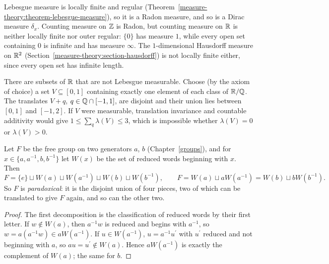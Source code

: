 \begin{example}\label{measure-theory:example-regular}
Lebesgue measure is locally finite and regular (Theorem~\ref{measure-theory:theorem-lebesgue-measure}), so it is a Radon measure, and so is a Dirac measure $\delta_x$. Counting measure on $\mathbb{Z}$ is
Radon, but counting measure on $\mathbb{R}$ is neither locally finite nor outer regular: $\{0\}$ has measure $1$, while every open set containing $0$ is infinite and has measure $\infty$. The
$1$-dimensional Hausdorff measure on $\mathbb{R}^2$ (Section~\ref{measure-theory:section-hausdorff}) is not locally finite either, since every open set has infinite length.
\end{example}

\begin{counterexample}\label{measure-theory:counterexample-vitali}
There are subsets of $\mathbb{R}$ that are not Lebesgue measurable. Choose (by the axiom of choice) a set $V \subseteq [0, 1]$ containing exactly one element of each class of $\mathbb{R}/\mathbb{Q}$. The translates $V + q$, $q \in \mathbb{Q} \cap [-1, 1]$,
are disjoint and their union lies between $[0, 1]$ and $[-1, 2]$. If $V$ were measurable, translation invariance and countable additivity would give $1 \leq \sum_q\lambda(V) \leq 3$, which is impossible
whether $\lambda(V) = 0$ or $\lambda(V) > 0$.
\end{counterexample}

\begin{proposition}\label{measure-theory:proposition-free-group-paradox}
Let $F$ be the free group on two generators $a$, $b$ (Chapter~\ref{groups}), and for $x \in \{a, a^{-1}, b, b^{-1}\}$ let $W(x)$ be the set of reduced words beginning with $x$. Then
\[
F = \{e\} \sqcup W(a) \sqcup W(a^{-1}) \sqcup W(b) \sqcup W(b^{-1}), \qquad F = W(a) \sqcup aW(a^{-1}) = W(b) \sqcup bW(b^{-1}).
\]
So $F$ is \emph{paradoxical}: it is the disjoint union of four pieces, two of which can be translated to give $F$ again, and so can the other two.
\end{proposition}

\begin{proof}
The first decomposition is the classification of reduced words by their first letter. If $w \notin W(a)$, then $a^{-1}w$ is reduced and begins with $a^{-1}$, so $w = a(a^{-1}w) \in aW(a^{-1})$. If
$u \in W(a^{-1})$, $u = a^{-1}u^{\prime}$ with $u^{\prime}$ reduced and not beginning with $a$, so $au = u^{\prime} \notin W(a)$. Hence $aW(a^{-1})$ is exactly the complement of $W(a)$; the same for $b$.
\end{proof}

